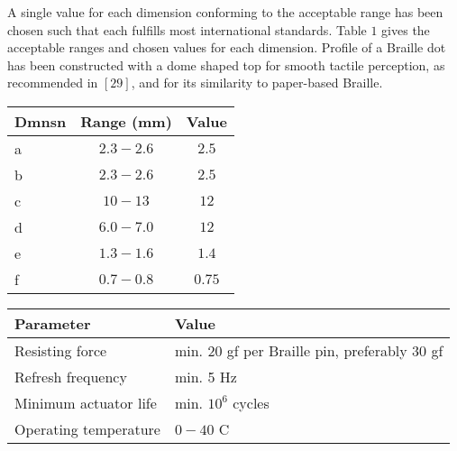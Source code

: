 \documentclass[a4paper,12pt]{article}
\begin{document}
\begin{minipage}{0.45\textwidth}
A single value for each dimension conforming to the acceptable range has been chosen such that each fulfills most international standards. Table $1$ gives the acceptable ranges and chosen values for each dimension. Profile of a Braille dot has been constructed with a dome shaped top for smooth tactile perception, as recommended in $[29]$, and for its similarity to paper-based Braille.

\begin{center}
\end{center}

\begin{tabular}{lcc}
\hline
Dmnsn & Range (mm) & Value\\ [5 pt]
\hline
a & $2.3-2.6$ & $2.5$\\
b& $2.3-2.6$ & $2.5$\\
c& $10-13$ & $12$\\
d& $6.0-7.0$ & $12$ \\
e& $1.3-1.6$ & $1.4$\\
f & $0.7-0.8$ & $0.75$\\
\hline
\end{tabular}

\begin{center}

\begin{tabular}{p{2 cm} p{3 cm}}
\hline
Parameter & Value\\ [5 pt]
\hline
Resisting force & min. $20$ gf per Braille pin, preferably $30$ gf\\ [3 pt]
Refresh frequency & min. 5 Hz\\ [3 pt]
Minimum actuator life & min. $10^6$ cycles\\ [3 pt]
Operating temperature & $0-40$ C\\
\end{tabular}
\end{center}
\end{minipage}
\end{document}
